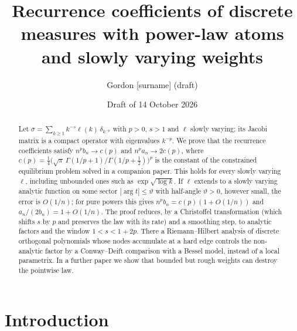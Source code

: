 
\providecommand{\Ath}[1]{\textup{(A$_{#1}$)}}
\providecommand{\ceil}[1]{\lceil #1\rceil}

\title[Recurrence coefficients with slowly varying weights]{Recurrence coefficients of discrete measures with
power-law atoms and slowly varying weights}
\author{Gordon [surname] (draft)}
\date{Draft of 14 October 2026}

\begin{abstract}
Let $\sigma=\sum_{k\ge1}k^{-s}\ell(k)\,\delta_{k^{-p}}$ with $p>0$, $s>1$ and $\ell$ slowly varying; its Jacobi
matrix is a compact operator with eigenvalues $k^{-p}$. We prove that the recurrence coefficients satisfy
$n^pb_n\to c(p)$ and $n^pa_n\to2c(p)$, where
$c(p)=\frac14\bigl(\sqrt\pi\,\Gamma(1/p+1)/\Gamma(1/p+\frac12)\bigr)^p$ is the constant of the constrained
equilibrium problem solved in a companion paper. This holds for every slowly varying $\ell$, including unbounded ones
such as $\exp\sqrt{\log k}$. If $\ell$ extends to a slowly varying analytic function on some sector $|\arg t|\le\vartheta$ with half-angle $\vartheta>0$, however small, the error is $O(1/n)$; for pure powers this
gives $n^pb_n=c(p)(1+O(1/n))$ and $a_n/(2b_n)=1+O(1/n)$. The proof reduces, by a Christoffel transformation (which
shifts $s$ by $p$ and preserves the law with its rate) and a smoothing step, to analytic factors and the window
$1<s<1+2p$. There a Riemann--Hilbert analysis of discrete orthogonal polynomials whose nodes accumulate at a hard edge
controls the non-analytic factor by a Conway--Deift comparison with a Bessel model, instead of a local parametrix. In
a further paper we show that bounded but rough weights can destroy the pointwise law.
\end{abstract}

\maketitle

\section{Introduction}\label{sec:intro}

